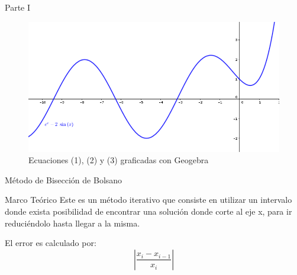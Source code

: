 \documentclass[legalpaper, 12pt]{article}
\begin{document}
\begin{section}{Parte I}
\begin{figure}[h]
      \includegraphics[scale=0.8]{eq3}
      \caption{Ecuaciones (1), (2) y (3) graficadas con Geogebra}
    \end{figure}
    \newpage
    \begin{subsection}{Método de Bisección de Bolsano}
      \begin{subsubsection}{Marco Teórico}
        Este es un método iterativo que consiste en utilizar un intervalo donde exista posibilidad de encontrar una solución donde corte al eje x, para ir reduciéndolo hasta llegar a la misma.

        El error es calculado por:
        \[\left|\frac{x_i-x_{i-1}}{x_i}\right|\]


\end{subsubsection}
\end{subsection}
\end{section}
\end{document}
